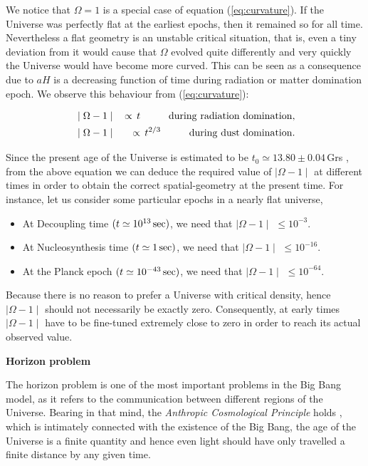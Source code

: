 \documentclass{rmaa}
\def\bea{\begin{eqnarray}}
\def\eea{\end{eqnarray}}
\begin{document}
We notice that $\Omega=1$ is a special case of equation (\ref{eq:curvature}). 
If the Universe was 
perfectly flat at the earliest epochs,  then it remained so for all time. 
Nevertheless a flat geometry is an unstable
critical situation, that is, even a tiny deviation from it would cause that $\Omega$ evolved 
quite differently and very quickly the Universe would have become more curved. 
This can be seen as a consequence due to $aH$ is a decreasing function of time 
during radiation or matter domination epoch.
We observe this behaviour from (\ref{eq:curvature}):
%

\bea
&\mid \Omega-1\mid & \, \propto \, t  \hspace{1cm} {\rm during\,\,radiation\,\, domination},\nonumber \\ 
&\mid \Omega-1\mid & \, \propto \, t^{2/3}  \hspace{1cm} {\rm during\,\,dust\,\, domination}. \nonumber
\eea

\noindent
Since the present age of the Universe is estimated to be $t_0 \simeq 13.80\pm0.04 
\, $Grs \citep{Apar}, from the above equation we can 
deduce the required value of $\mid \Omega-1\mid$ at different times in order to 
obtain the correct spatial-geometry at the present time. For instance, let us consider some 
particular epochs in a nearly flat universe,

\begin{itemize}
\item At Decoupling time  $(t \simeq 10^{13}\, {\rm sec})$, we need that $\mid \Omega-1 \mid$ $\le 10^{-3}$.
\item  At Nucleosynthesis time $(t \simeq 1\, {\rm sec})$, we need that $\mid \Omega-1 \mid$ $\le 10^{-16}$.
\item  At the Planck epoch $(t \simeq 10^{-43}\, {\rm sec})$, we need that $\mid \Omega-1 \mid$  $\le 10^{-64}$.
\end{itemize}
% 
%
Because there is no reason to prefer a Universe with critical density, hence
$\mid \Omega-1\mid$ should not necessarily be exactly zero. 
Consequently, at early times 
$\mid \Omega-1\mid$ have to be fine-tuned extremely close to zero in order to reach 
its actual observed value.



\vskip 16pt
\textbf{Horizon problem} 
\vskip 10pt

The horizon problem is one of the most important problems in the Big Bang model,
as it refers to the communication between different regions of the Universe. 
%
Bearing in that mind, the \textit{Anthropic Cosmological Principle} holds 
\citep{Barrow, Coles}, which is intimately connected
with the existence of the Big Bang, the age of the Universe is a finite quantity and hence
even light should have only travelled a finite distance by any given time. 
\\
\end{document}
